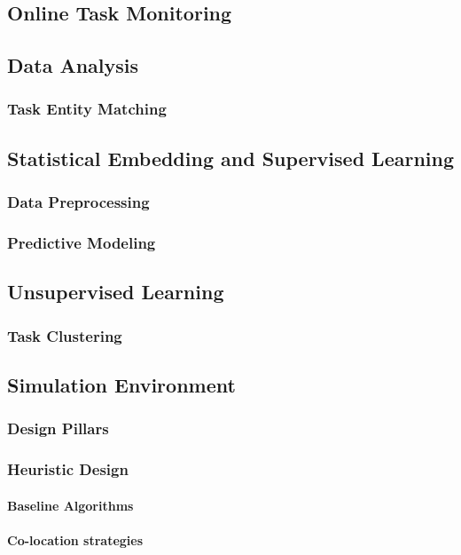 \subsection{Online Task Monitoring}
\label{sec:online_task_monitoring}

\subsection{Data Analysis}
\label{sec:data_analysis}

\subsubsection{Task Entity Matching}
\label{sec:task_entity_matching}

\subsection{Statistical Embedding and Supervised Learning}
\label{sec:statistical_embedding_and_supervised_learning}

\subsubsection{Data Preprocessing}
\label{sec:data_preprocessing}

\subsubsection{Predictive Modeling}
\label{sec:predictive_modeling}

\subsection{Unsupervised Learning}
\label{sec:unsupervised_learning}

\subsubsection{Task Clustering}
\label{sec:task_clustering}

\subsection{Simulation Environment}
\label{sec:simulation_environment}

\subsubsection{Design Pillars}
\label{sec:design_pillars}

\subsubsection{Heuristic Design}
\label{sec:heuristic_design}

\paragraph{Baseline Algorithms}
\label{sec:baseline_algorithms}

\paragraph{Co-location strategies}
\label{sec:co-location_strategies}